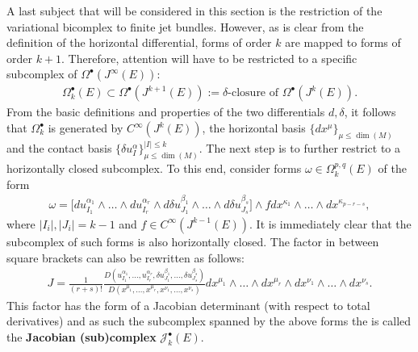     A last subject that will be considered in this section is the restriction of the variational bicomplex to finite jet bundles. However, as is clear from the definition of the horizontal differential, forms of order $k$ are mapped to forms of order $k+1$. Therefore, attention will have to be restricted to a specific subcomplex of $\Omega^\bullet(J^\infty(E))$:
    \begin{gather}
        \Omega^\bullet_k(E)\subset\Omega^\bullet(J^{k+1}(E)) := \delta\text{-closure of }\Omega^\bullet(J^k(E)).
    \end{gather}
    From the basic definitions and properties of the two differentials $d,\delta$, it follows that $\Omega^\bullet_k$ is generated by $C^\infty(J^k(E))$, the horizontal basis $\{dx^\mu\}_{\mu\leq\dim(M)}$ and the contact basis $\{\delta u^\alpha_I\}_{\mu\leq\dim(M)}^{|I|\leq k}$.
    The next step is to further restrict to a horizontally closed subcomplex. To this end, consider forms $\omega\in\Omega^{p,q}_k(E)$ of the form
    \begin{gather}
        \omega = \Big[du^{\alpha_1}_{I_1}\wedge\ldots\wedge du^{\alpha_r}_{I_r}\wedge d\delta u^{\beta_1}_{J_1}\wedge\ldots\wedge d\delta u^{\beta_s}_{J_s}\Big]\wedge fdx^{\kappa_1}\wedge\ldots\wedge dx^{\kappa_{p-r-s}},
    \end{gather}
    where $|I_i|,|J_i|=k-1$ and $f\in C^\infty(J^{k-1}(E))$. It is immediately clear that the subcomplex of such forms is also horizontally closed. The factor in between square brackets can also be rewritten as follows:
    \begin{gather}
        J = \frac{1}{(r+s)!}\frac{D(u^{\alpha_1}_{I_1},\ldots,u^{\alpha_r}_{I_r},\delta u^{\beta_1}_{J_1},\ldots,\delta u^{\beta_s}_{J_s})}{D(x^{\mu_1},\ldots,x^{\mu_r},x^{\nu_1},\ldots,x^{\nu_s})} dx^{\mu_1}\wedge\ldots\wedge dx^{\mu_r}\wedge dx^{\nu_1}\wedge\ldots\wedge dx^{\nu_s}.
    \end{gather}
    This factor has the form of a Jacobian determinant (with respect to total derivatives) and as such the subcomplex spanned by the above forms the is called the \textbf{Jacobian (sub)complex} $\mathcal{J}^\bullet_k(E)$.

